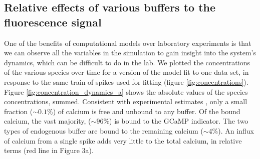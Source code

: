 \documentclass[a4paper,12pt]{article}
\theoremstyle{definition}
\begin{document}
\subsection{Relative effects of various buffers to the fluorescence signal}
One of the benefits of computational models over laboratory experiments is that we can observe all the variables in the simulation to gain insight into the system’s dynamics, which can be difficult to do in the lab. We plotted the concentrations of the various species over time for a version of the model fit to one data set, in response to the same train of spikes used for fitting (figure \ref{fig:concentrations}). Figure \ref{fig:concentration_dynamics_a} shows the absolute values of the species concentrations, summed. Consistent with experimental estimates \cite{maravall}, only a small fraction ($\sim 0.1\%$) of calcium is free and unbound to any buffer. Of the bound calcium, the vast majority, ($\sim 96\%$) is bound to the GCaMP indicator. The two types of endogenous buffer are bound to the remaining calcium ($\sim 4\%$). An influx of calcium from a single spike adds very little to the total calcium, in relative terms (red line in Figure 3a).
\end{document}
